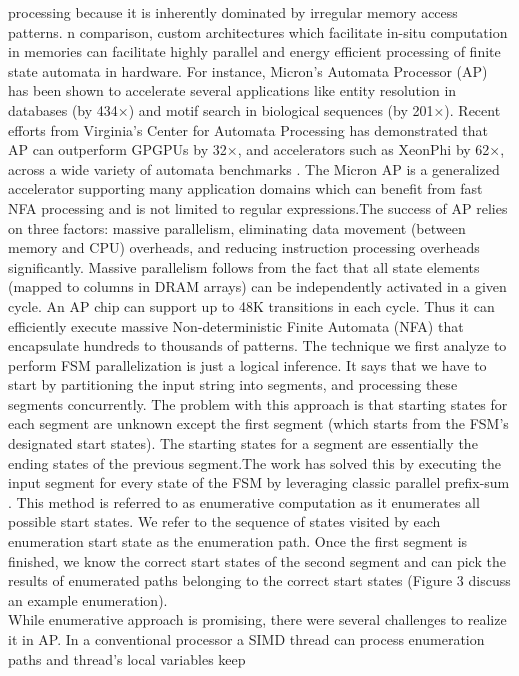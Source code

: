 processing because it is inherently dominated by irregular memory
access patterns. 
n comparison, custom architectures which facilitate in-situ computation in memories can facilitate highly parallel and energy efficient processing of finite state automata in hardware. For instance,
Micron’s Automata Processor (AP) \cite{11} has been shown to accelerate several applications like entity resolution in databases (by
434×) and motif search in biological sequences  (by 201×).
Recent efforts from Virginia’s Center for Automata Processing has
demonstrated that AP can outperform GPGPUs by 32×, and accelerators such as XeonPhi by 62×, across a wide variety of automata
benchmarks .
The Micron AP is a generalized accelerator supporting many application domains which can benefit from fast NFA processing and is
not limited to regular expressions.The success of AP relies on three
factors: massive parallelism, eliminating data movement (between
memory and CPU) overheads, and reducing instruction processing
overheads significantly. Massive parallelism follows from the fact that all state elements (mapped to columns in DRAM arrays) can be
independently activated in a given cycle. An AP chip can support
up to 48K transitions in each cycle. Thus it can efficiently execute
massive Non-deterministic Finite Automata (NFA) that encapsulate
hundreds to thousands of patterns.
The technique we first analyze to perform FSM parallelization is just a logical inference. It says that we have to start by partitioning the input string into segments, and processing these segments concurrently. The problem with this approach is that starting states for each segment are unknown except the first segment (which starts from the FSM’s designated start states). The starting states for a segment are essentially the ending states of the previous segment.The work \cite{2} has solved this by executing the input segment for every
state of the FSM by leveraging classic parallel prefix-sum . This
method is referred to as enumerative computation as it enumerates
all possible start states. We refer to the sequence of states visited by
each enumeration start state as the enumeration path. Once the first
segment is finished, we know the correct start states of the second
segment and can pick the results of enumerated paths belonging to
the correct start states (Figure 3 discuss an example
enumeration).\\
While enumerative approach is promising, there were several challenges to realize it in AP. In a conventional processor a SIMD thread
can process enumeration paths and thread’s local variables keep
